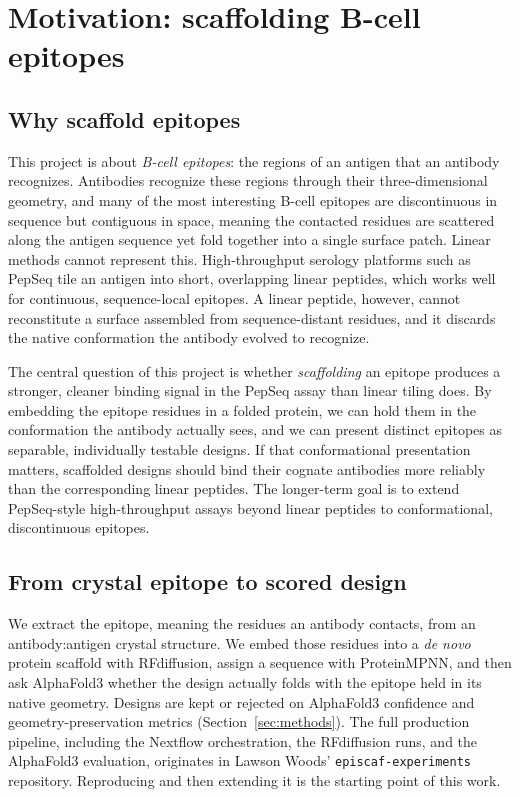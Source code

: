 \section{Motivation: scaffolding B-cell epitopes}\label{sec:intro}

\subsection{Why scaffold epitopes}
This project is about \emph{B-cell epitopes}: the regions of an antigen that an antibody
recognizes. Antibodies recognize these regions through their three-dimensional geometry,
and many of the most interesting B-cell epitopes are discontinuous in sequence but
contiguous in space, meaning the contacted residues are scattered along the antigen
sequence yet fold together into a single surface patch. Linear methods cannot represent
this. High-throughput serology platforms such as
PepSeq tile an antigen into short, overlapping linear peptides, which works well for
continuous, sequence-local epitopes. A linear peptide, however, cannot reconstitute a
surface assembled from sequence-distant residues, and it discards the native conformation
the antibody evolved to recognize.

The central question of this project is whether \emph{scaffolding} an epitope produces a
stronger, cleaner binding signal in the PepSeq assay than linear tiling does. By embedding
the epitope residues in a folded protein, we can hold them in the conformation the antibody
actually sees, and we can present distinct epitopes as separable, individually testable
designs. If that conformational presentation matters, scaffolded designs should bind their
cognate antibodies more reliably than the corresponding linear peptides. The longer-term
goal is to extend PepSeq-style high-throughput assays beyond linear peptides to
conformational, discontinuous epitopes.

\subsection{From crystal epitope to scored design}
We extract the epitope, meaning the residues an antibody contacts, from an antibody:antigen
crystal structure. We embed those residues into a \emph{de novo} protein scaffold with
RFdiffusion, assign a sequence with ProteinMPNN, and then ask AlphaFold3 whether the design
actually folds with the epitope held in its native geometry. Designs are kept or rejected
on AlphaFold3 confidence and geometry-preservation metrics (Section~\ref{sec:methods}). The
full production pipeline, including the Nextflow orchestration, the RFdiffusion runs, and
the AlphaFold3 evaluation, originates in Lawson Woods' \texttt{episcaf-experiments}
repository. Reproducing and then extending it is the starting point of this work.

